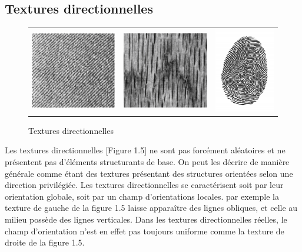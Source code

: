 \subsection{Textures directionnelles}

\begin{figure}[htbp]
\centering
\begin{tabular}{ccc}
\centering
\includegraphics[width=5cm,]{Figures/chap1/direction.png}
&
\includegraphics[width=5cm,]{Figures/chap1/directionel1.png}
&
\includegraphics[width=3.5cm,]{Figures/chap1/directionel2.png}\\

\end{tabular}
\caption[textureDirex]{Textures directionnelles}
\end{figure}              


\indent Les textures directionnelles [Figure 1.5] ne sont pas forcément aléatoires et ne présentent pas d’éléments structurants de base.
On peut les décrire de manière générale comme étant des textures  présentant des structures orientées selon une direction privilégiée.
Les textures directionnelles se caractérisent soit par leur orientation globale, soit par un champ d’orientations locales. par exemple la texture de gauche de la figure 1.5 laisse apparaître des lignes obliques, et celle au milieu possède des lignes verticales.
Dans les textures directionnelles réelles, le champ d’orientation n’est en effet pas toujours uniforme comme la texture de droite de la figure 1.5.


